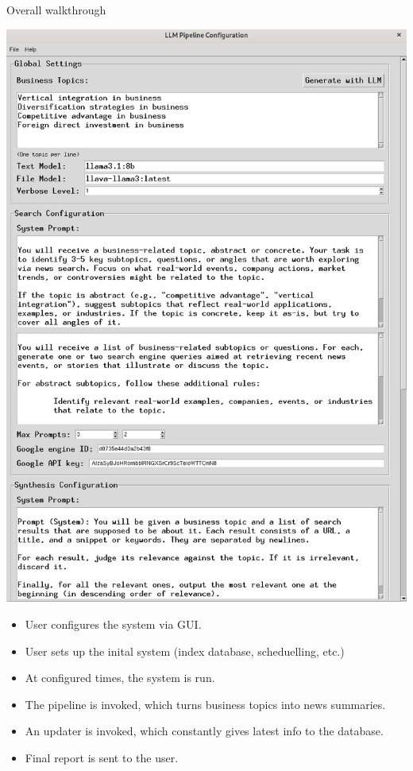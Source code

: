 \documentclass{beamer}
\begin{document}
\begin{frame}{Overall walkthrough}
\begin{minipage}{.34\textwidth}
	\includegraphics[height=.7\textheight]{../../deliverables/thesis/res/gui.png}
\end{minipage}%
\begin{minipage}{.65\textwidth}
	\begin{itemize}
	\item User configures the system via GUI.
	\item User sets up the inital system (index database, scheduelling, etc.)
	\item At configured times, the system is run.
	\item The pipeline is invoked, which turns business topics into news summaries.
	\item An updater is invoked, which constantly gives latest info to the database.
	\item Final report is sent to the user.
	\end{itemize}
\end{minipage}
\end{frame}
\end{document}
